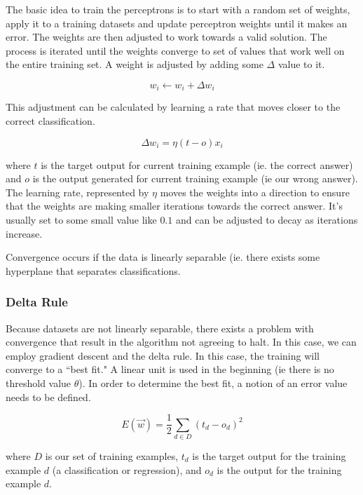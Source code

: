 \documentclass[titlepage,11pt]{article}
\begin{document}
The basic idea to train the perceptrons is to start with a random set of weights, apply it to a training datasets and update perceptron weights until it makes an error. The weights are then adjusted to work towards a valid solution. The process is iterated until the weights converge to set of values that work well on the entire training set. A weight is adjusted by adding some $\Delta$ value to it.

\begin{equation}
w_i \leftarrow w_i + \Delta w_i
\end{equation}

This adjustment can be calculated by learning a rate that moves closer to the correct classification.

\begin{equation}
\Delta w_i=\eta (t-o) x_i
\end{equation}

where $t$ is the target output for current training example (ie. the correct answer) and $o$ is the output generated for current training example (ie our wrong answer). The learning rate, represented by $\eta$ moves the weights into a direction to ensure that the weights are making smaller iterations towards the correct answer. It's usually set to some small value like $0.1$ and can be adjusted to decay as iterations increase.

Convergence occurs if the data is linearly separable (ie. there exists some hyperplane that separates classifications.

\subsubsection*{Delta Rule}

Because datasets are not linearly separable, there exists a problem with convergence that result in the algorithm not agreeing to halt. In this case, we can employ gradient descent and the delta rule. In this case, the training will converge to a ``best fit." A linear unit is used in the beginning (ie there is no threshold value $\theta$). In order to determine the best fit, a notion of an error value needs to be defined.

\begin{equation}
E(\vec{w})=\frac{1}{2} \sum_{d \in D} (t_d - o_d)^2
\end{equation}

where $D$ is our set of training examples, $t_d$ is the target output for the training example $d$ (a classification or regression), and $o_d$ is the output for the training example $d$.
\end{document}
